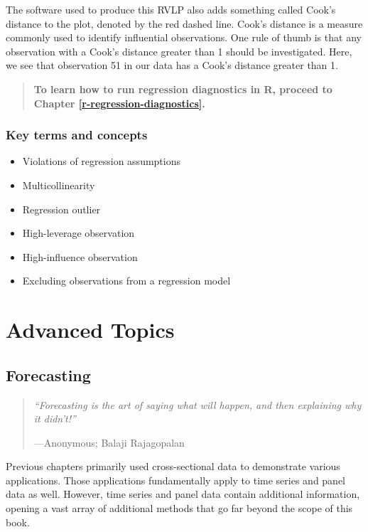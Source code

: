 \documentclass[
]{book}
\providecommand{\tightlist}{%
  \setlength{\itemsep}{0pt}\setlength{\parskip}{0pt}}
\begin{document}
The software used to produce this RVLP also adds something called Cook's distance to the plot, denoted by the red dashed line. Cook's distance is a measure commonly used to identify influential observations. One rule of thumb is that any observation with a Cook's distance greater than 1 should be investigated. Here, we see that observation 51 in our data has a Cook's distance greater than 1.

\begin{quote}
\textbf{To learn how to run regression diagnostics in R, proceed to Chapter \ref{r-regression-diagnostics}.}
\end{quote}

\hypertarget{kt13}{%
\section{Key terms and concepts}\label{kt13}}

\begin{itemize}
\tightlist
\item
  Violations of regression assumptions
\item
  Multicollinearity
\item
  Regression outlier
\item
  High-leverage observation
\item
  High-influence observation
\item
  Excluding observations from a regression model
\end{itemize}

\hypertarget{part-advanced-topics}{%
\part{Advanced Topics}\label{part-advanced-topics}}

\hypertarget{forecasting}{%
\chapter{Forecasting}\label{forecasting}}

\begin{quote}
\emph{``Forecasting is the art of saying what will happen, and then explaining why it didn't!''}

---Anonymous; Balaji Rajagopalan
\end{quote}

Previous chapters primarily used cross-sectional data to demonstrate various applications. Those applications fundamentally apply to time series and panel data as well. However, time series and panel data contain additional information, opening a vast array of additional methods that go far beyond the scope of this book.
\end{document}
